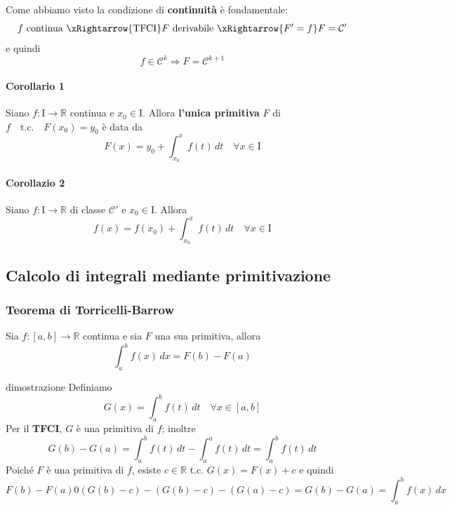 \documentclass[x11names]{article}
\begin{document}
	Come abbiamo visto la condizione di \textbf{continuità} è fondamentale:
	\[
	f \text{ continua } \xRightarrow{\text{TFCI}} F \text{ derivabile } \xRightarrow{F' = f} F = \mathcal{C}'
	\]
	e quindi
	\[
	f \in \mathcal{C}^k \Longrightarrow F = \mathcal{C}^{k+1}
	\]
	
	\paragraph{Corollario 1} Siano $f: \text{I} \to \mathbb{R}$ continua e $x_0 \in \text{I}$. Allora \textbf{l'unica primitiva} $F$ di $f \quad \text{t.c.} \quad  F(x_0) = y_0$ è data da
	\[
	F(x) = y_0 + \int_{x_0}^{x}f(t) \,dt \quad \forall x \in \text{I}
	\]
	\paragraph{Corollazio 2} Siano $f: \text{I} \to \mathbb{R}$ di classe $\mathcal{C}'$ e $x_0 \in \text{I}$. Allora
	\[
	f(x) = f(x_0) + \int_{x_0}^{x}f(t) \,dt \quad \forall x \in \text{I}
	\]
	
	\subsection{Calcolo di integrali mediante primitivazione}
	\begin{center}
		\colorbox{myred}{\begin{minipage}{5.75in}
				\begin{redes}{}
					\subsubsection{Teorema di Torricelli-Barrow}
					Sia $f: [a,b] \to \mathbb{R}$ continua e sia $F$ una sua primitiva, allora
					\[
					\int_{a}^{b}f(x) \,dx = F(b) - F(a)
					\]
				\end{redes}
		\end{minipage}}        
	\end{center}
	\begin{es}{dimostrazione}
		Definiamo
		\[
		G(x) = \int_{a}^{b}f(t) \,dt \quad \forall x \in [a,b]
		\]
		Per il \textbf{TFCI}, $G$ è una primitiva di $f$; inoltre
		\[
		G(b) - G(a) = \int_{a}^{b}f(t) \,dt - \int_{a}^{a}f(t) \,dt  = \int_{a}^{b}f(t) \,dt
		\]
		Poiché $F$ è una primitiva di $f$, esiste $c \in \mathbb{R}$ t.c. $G(x) = F(x) + c$ e quindi
		\[
		F(b) - F(a) 0 \left(G(b) - c\right) - \left( G(b) - c\right) - \left( G(a) - c\right) = G(b) - G(a) = \int_{a}^{b}f(x) \,dx
		\]
	\end{es}
	
\end{document}
